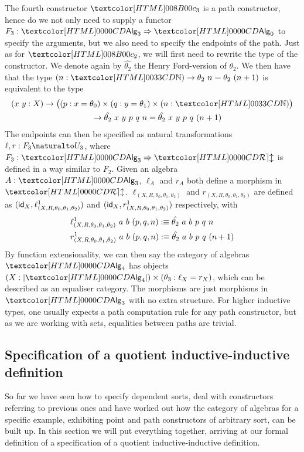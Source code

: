 The fourth constructor $\Bciii$ is a path constructor, hence do we not
only need to supply a functor $F_3 : \Func{\Alg_3}{\Alg_0}$ to specify
the arguments, but we also need to specify the endpoints of the
path. Just as for $\Bcii$, we will first need to rewrite the type of
the constructor. We denote again by $\hat{\theta_2}$ the Henry
Ford-version of $\theta_2$.  We then have that the type
$(n : \natty) \to \theta_2\ n = \theta_2\ (n+ 1)$ is equivalent to the
type
%
\begin{multline*}
(x\ y : X) \to \big((p : x =  \theta_0) \times (q : y = \theta_1) \times (n : \natty)\big) \\
\ \ \ \ \to \hat{\theta_2}\ x\ y\ p\ q\ n = \hat{\theta_2}\ x\ y\ p\ q\ (n+1)
\end{multline*}
%
The endpoints can then be specified as natural transformations
$\ell, r : \Nat{F_3}{U_3}$, where $F_3 : \Func{\Alg_3}{\REL}$ is defined in a
way similar to $F_2$. Given an algebra $A : \Alg_3$, $\ell_A$ and $r_A$
both define a morphism in
$\REL$. $\ell_{(X,R,\theta_0,\theta_1,\theta_2)}$ and
$r_{(X,R,\theta_0,\theta_1,\theta_2)}$ are defined as
$(\id_X, \ell^1_{(X,R,\theta_0,\theta_1,\theta_2)})$ and
$(\id_X,r^1_{(X,R,\theta_0,\theta_1,\theta_2)})$ respectively, with
%
\begin{align*}
&\ell^1_{(X,R,\theta_0,\theta_1,\theta_2)}\ a\ b\ (p, q, n) :\equiv \hat{\theta_2}\ a\ b\ p\ q\ n \\
&r^1_{(X,R,\theta_0,\theta_1,\theta_2)}\ a\ b\ (p, q, n) :\equiv \hat{\theta_2}\ a\ b\ p\ q\ (n+1)
\end{align*}
%
By function extensionality, we can then say the category of algebras
$\Alg_4$ has objects
$(X : | \Alg_4 |) \times (\theta_3 : \ell_X = r_X)$, which can be
described as an equaliser category. The morphisms are just morphisms
in $\Alg_3$ with no extra structure. For higher inductive types, one
usually expects a path computation rule for any path constructor, but
as we are working with sets, equalities between paths are trivial.

\subsection{Specification of a quotient inductive-inductive definition}

So far we have seen how to specify dependent sorts, deal with
constructors referring to previous ones and have worked out how the
category of algebras for a specific example, exhibiting point and path
constructors of arbitrary sort, can be built up. In this section we
will put everything together, arriving at our formal definition of a
specification of a quotient inductive-inductive definition.

